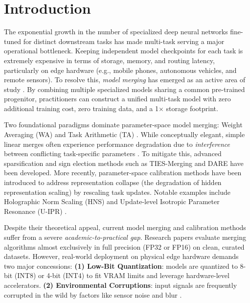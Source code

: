\documentclass{article}
\theoremstyle{plain}
\theoremstyle{definition}
\theoremstyle{remark}
\begin{document}
\vspace{-2.0mm}
\section{Introduction}
\label{sec:intro}
\vspace{-2.5mm}

The exponential growth in the number of specialized deep neural networks fine-tuned for distinct downstream tasks has made multi-task serving a major operational bottleneck. Keeping independent model checkpoints for each task is extremely expensive in terms of storage, memory, and routing latency, particularly on edge hardware (e.g., mobile phones, autonomous vehicles, and remote sensors). To resolve this, \emph{model merging} has emerged as an active area of study \cite{haji2024survey, le2023deep}. By combining multiple specialized models sharing a common pre-trained progenitor, practitioners can construct a unified multi-task model with zero additional training cost, zero training data, and a 1$\times$ storage footprint.

Two foundational paradigms dominate parameter-space model merging: Weight Averaging (WA) \cite{wortsman2022model} and Task Arithmetic (TA) \cite{ilharco2023editing}. While conceptually elegant, simple linear merges often experience performance degradation due to \emph{interference} between conflicting task-specific parameters \cite{yadav2023ties}. To mitigate this, advanced sparsification and sign election methods such as TIES-Merging \cite{yadav2023ties} and DARE \cite{yu2024language} have been developed. More recently, parameter-space calibration methods have been introduced to address representation collapse (the degradation of hidden representation scaling) by rescaling task updates. Notable examples include Holographic Norm Scaling (HNS) \cite{submission7} and Update-level Isotropic Parameter Resonance (U-IPR) \cite{submission9}.

Despite their theoretical appeal, current model merging and calibration methods suffer from a severe \emph{academic-to-practical gap}. Research papers evaluate merging algorithms almost exclusively in full precision (FP32 or FP16) on clean, curated datasets. However, real-world deployment on physical edge hardware demands two major concessions: \textbf{(1) Low-Bit Quantization}: models are quantized to 8-bit (INT8) or 4-bit (INT4) to fit VRAM limits and leverage hardware-level accelerators. \textbf{(2) Environmental Corruptions}: input signals are frequently corrupted in the wild by factors like sensor noise and blur \cite{hendrycks2019robustness}.
\end{document}
